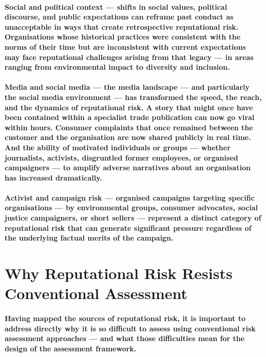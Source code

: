\paragraph{\textbf{Social and political context} — shifts in social values, political discourse, and public expectations can reframe past conduct as unacceptable in ways that create retrospective reputational risk. Organisations whose historical practices were consistent with the norms of their time but are inconsistent with current expectations may face reputational challenges arising from that legacy — in areas ranging from environmental impact to diversity and inclusion.}
\paragraph{\textbf{Media and social media} — the media landscape — and particularly the social media environment — has transformed the speed, the reach, and the dynamics of reputational risk. A story that might once have been contained within a specialist trade publication can now go viral within hours. Consumer complaints that once remained between the customer and the organisation are now shared publicly in real time. And the ability of motivated individuals or groups — whether journalists, activists, disgruntled former employees, or organised campaigners — to amplify adverse narratives about an organisation has increased dramatically.}
\paragraph{\textbf{Activist and campaign risk} — organised campaigns targeting specific organisations — by environmental groups, consumer advocates, social justice campaigners, or short sellers — represent a distinct category of reputational risk that can generate significant pressure regardless of the underlying factual merits of the campaign.}

\section{Why Reputational Risk Resists Conventional Assessment}
\paragraph{Having mapped the sources of reputational risk, it is important to address directly why it is so difficult to assess using conventional risk assessment approaches — and what those difficulties mean for the design of the assessment framework.}

